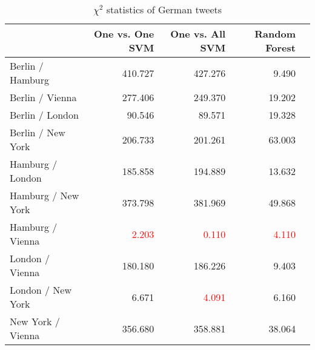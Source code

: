\begin{table}[ht]
	\caption{$\chi^2$ statistics of German tweets}
	\begin{tabular}{|l|r|r|r|r|} \hline
	{}&One vs. One SVM &One vs. All SVM&Random Forest\\ \hline
	Berlin / Hamburg & 410.727 & 427.276 & 9.490 \\ \hline
	Berlin / Vienna & 277.406 & 249.370 & 19.202\\ \hline
	Berlin / London & 90.546 & 89.571 & 19.328 \\ \hline
	Berlin / New York & 206.733 & 201.261  &  63.003 \\ \hline
	Hamburg / London & 185.858 & 194.889 & 13.632 \\ \hline
	Hamburg / New York & 373.798  &  381.969   & 49.868 \\ \hline
	Hamburg / Vienna &\textcolor{red}{2.203} &\textcolor{red}{0.110}  &\textcolor{red}{4.110} \\ \hline
	London / Vienna & 180.180 & 186.226 & 9.403\\ \hline
	London / New York & 6.671 & \textcolor{red}{4.091} &  6.160 \\ \hline
	New York / Vienna & 356.680  & 358.881 & 38.064 \\ \hline
	\end{tabular}
	\label{tab:result_chi_de}
\end{table}

